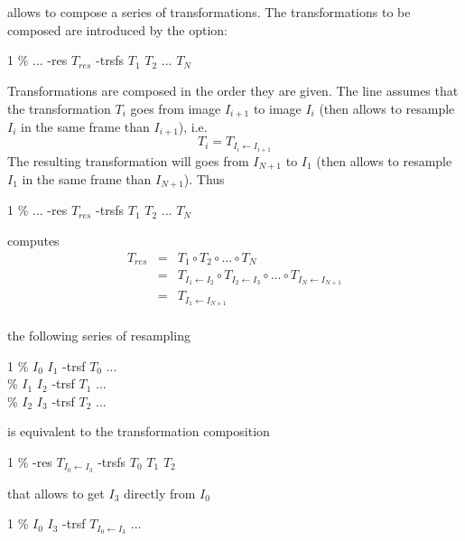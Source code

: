 \section{\applyTrsfToPoints}





\section{\buildPyramidImage}
\label{sec:buildPyramidImage}





\section{\composeTrsf}


\composeTrsf allows to compose a series of transformations. The transformations to be composed are introduced by the  option:
\begin{code}{1}
\% \composeTrsf ... -res $T_{res}$ -trsfs  $T_1$ $T_2$ ... $T_N$
\end{code}


Transformations are composed in the order they are given.
The line  assumes that the transformation
$T_i$ goes from image $I_{i+1}$ to image $I_{i}$ (then allows to resample
$I_{i}$ in the same frame than $I_{i+1}$), i.e.  
$$T_{i} = T_{I_{i} \leftarrow I_{i+1}}$$
The resulting transformation will goes from $I_{N+1}$ to $I_1$ 
(then allows to resample $I_1$ in the same frame than $I_{N+1}$). Thus 
\begin{code}{1}
\% \composeTrsf ... -res $T_{res}$ -trsfs  $T_1$ $T_2$ ... $T_N$
\end{code}
computes
\begin{eqnarray*}
T_{res} & = & T_1 \circ T_2 \circ ... \circ T_N \\
& = & T_{I_{1} \leftarrow I_{2}} \circ  
      T_{I_{2} \leftarrow I_{3}} \circ  ... \circ 
      T_{I_{N} \leftarrow I_{N+1}} \\
& = & T_{I_{1} \leftarrow I_{N+1}} \\
\end{eqnarray*}


 the following series of resampling
\begin{code}{1}
\% \applyTrsf $I_0$ $I_1$ -trsf $T_0$ ... \\
\% \applyTrsf $I_1$ $I_2$ -trsf $T_1$ ... \\
\% \applyTrsf $I_2$ $I_3$ -trsf $T_2$ ...
\end{code}
is equivalent to the transformation composition
\begin{code}{1}
\% \composeTrsf -res $T_{I_0 \leftarrow I_3}$ -trsfs $T_0$ $T_1$ $T_2$
\end{code}
that allows to get $I_3$ directly from $I_0$
\begin{code}{1}
\% \applyTrsf $I_0$ $I_3$ -trsf $T_{I_0 \leftarrow I_3}$ ... 
\end{code}


